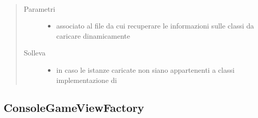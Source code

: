 \documentclass[letterpaper,10pt,italian,openany,oneside]{sphinxmanual}
\begin{document}
\begin{fulllineitems}
\label{\detokenize{source/it/unicam/cs/pa/mastermind/factories/BreakerFactoryRegistry:it.unicam.cs.pa.mastermind.factories.BreakerFactoryRegistry.BreakerFactoryRegistry(String)}}~\begin{quote}\begin{description}
\item[{Parametri}] \leavevmode\begin{itemize}
\item {} 
 \textendash{} associato al file da cui recuperare le informazioni sulle classi da caricare dinamicamente

\end{itemize}

\item[{Solleva}] \leavevmode\begin{itemize}
\item {} 
 \textendash{} in caso le istanze caricate non siano appartenenti a classi implementazione di 

\end{itemize}

\end{description}\end{quote}

\end{fulllineitems}



\subsection{ConsoleGameViewFactory}
\label{\detokenize{source/it/unicam/cs/pa/mastermind/factories/ConsoleGameViewFactory:consolegameviewfactory}}\label{\detokenize{source/it/unicam/cs/pa/mastermind/factories/ConsoleGameViewFactory::doc}}
\end{document}
